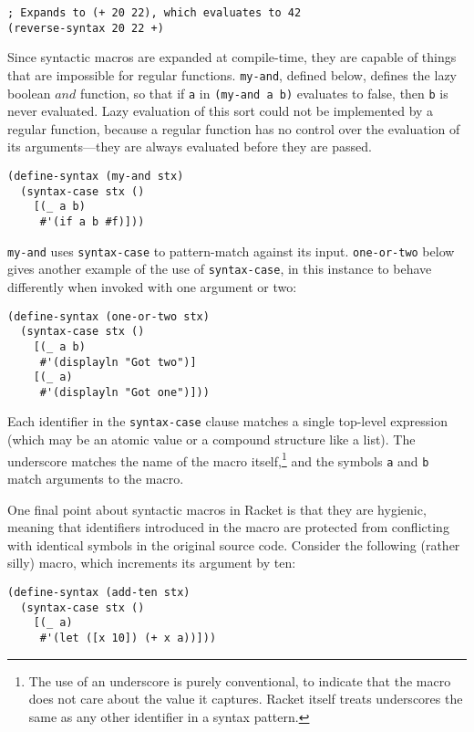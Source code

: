 \documentclass{article}
\begin{document}
\begin{lstlisting}
; Expands to (+ 20 22), which evaluates to 42
(reverse-syntax 20 22 +)
\end{lstlisting}

Since syntactic macros are expanded at compile-time, they are capable of things that are impossible for regular functions. \texttt{my-and}, defined below, defines the lazy boolean $and$ function, so that if \texttt{a} in \texttt{(my-and a b)} evaluates to false, then \texttt{b} is never evaluated. Lazy evaluation of this sort could not be implemented by a regular function, because a regular function has no control over the evaluation of its arguments---they are always evaluated before they are passed.

\begin{lstlisting}
(define-syntax (my-and stx)
  (syntax-case stx ()
    [(_ a b)
     #'(if a b #f)]))
\end{lstlisting}

\texttt{my-and} uses \texttt{syntax-case} to pattern-match against its input. \texttt{one-or-two} below gives another example of the use of \texttt{syntax-case}, in this instance to behave differently when invoked with one argument or two:

\begin{lstlisting}
(define-syntax (one-or-two stx)
  (syntax-case stx ()
    [(_ a b)
     #'(displayln "Got two")]
    [(_ a)
     #'(displayln "Got one")]))
\end{lstlisting}

Each identifier in the \texttt{syntax-case} clause matches a single top-level expression (which may be an atomic value or a compound structure like a list). The underscore matches the name of the macro itself,\footnote{The use of an underscore is purely conventional, to indicate that the macro does not care about the value it captures. Racket itself treats underscores the same as any other identifier in a syntax pattern.} and the symbols \texttt{a} and \texttt{b} match arguments to the macro.

One final point about syntactic macros in Racket is that they are hygienic, meaning that identifiers introduced in the macro are protected from conflicting with identical symbols in the original source code. Consider the following (rather silly) macro, which increments its argument by ten:

\begin{lstlisting}
(define-syntax (add-ten stx)
  (syntax-case stx ()
    [(_ a)
     #'(let ([x 10]) (+ x a))]))
\end{lstlisting}
\end{document}
